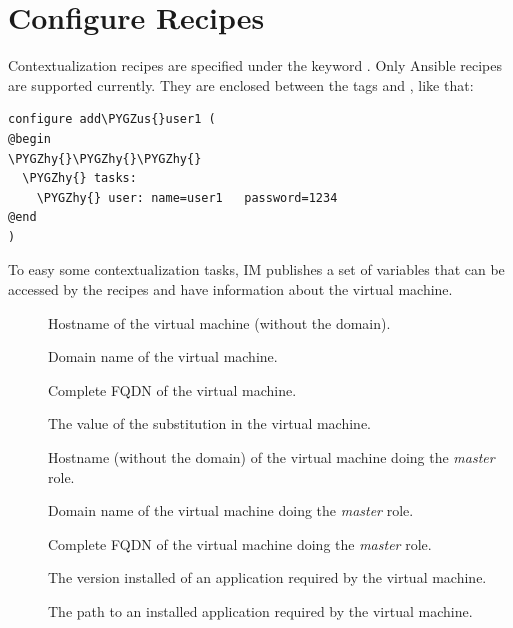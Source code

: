 \documentclass[letterpaper,10pt,english]{sphinxmanual}
\def\PYGZus{\char`\_}
\def\PYGZhy{\char`\-}
\begin{document}
\section{Configure Recipes}
\label{radl:configure-recipes}
Contextualization recipes are specified under the keyword .
Only Ansible recipes are supported currently. They are enclosed between the
tags  and , like that:

\begin{Verbatim}[commandchars=\\\{\}]
configure add\PYGZus{}user1 (
@begin
\PYGZhy{}\PYGZhy{}\PYGZhy{}
  \PYGZhy{} tasks:
    \PYGZhy{} user: name=user1   password=1234
@end
)
\end{Verbatim}

To easy some contextualization tasks, IM publishes a set of variables that
can be accessed by the recipes and have information about the virtual machine.
\begin{description}
\item[{}] \leavevmode
Hostname of the virtual machine (without the domain).

\item[{}] \leavevmode
Domain name of the virtual machine.

\item[{}] \leavevmode
Complete FQDN of the virtual machine.

\item[{}] \leavevmode
The value of the substitution  in the virtual machine.

\item[{}] \leavevmode
Hostname (without the domain) of the virtual machine doing the \emph{master}
role.

\item[{}] \leavevmode
Domain name of the virtual machine doing the \emph{master} role.

\item[{}] \leavevmode
Complete FQDN of the virtual machine doing the \emph{master} role.

\item[{}] \leavevmode
The version installed of an application required by the virtual machine.

\item[{}] \leavevmode
The path to an installed application required by the virtual machine.

\end{description}
\end{document}
